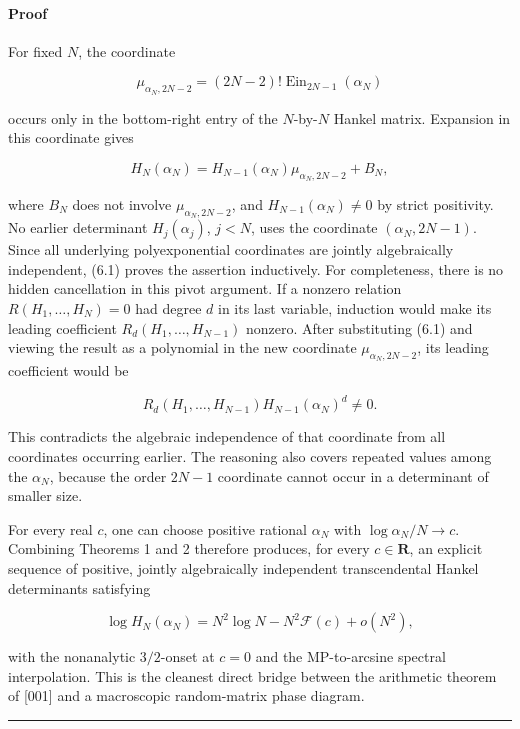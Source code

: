\documentclass[11pt]{article}
\theoremstyle{keio}
\theoremstyle{definition}
\theoremstyle{remark}
\newcommand{\Ein}{\operatorname{Ein}}
\begin{document}
\paragraph{Proof}

For fixed \(N\), the coordinate

\[
\mu_{\alpha_N,2N-2}=(2N-2)!\Ein_{2N-1}(\alpha_N)
\]

occurs only in the bottom-right entry of the \(N\)-by-\(N\) Hankel matrix.
Expansion in this coordinate gives

\[
H_N(\alpha_N)
=H_{N-1}(\alpha_N)\mu_{\alpha_N,2N-2}+B_N, \tag{DS-6.1}
\]

where \(B_N\) does not involve \(\mu_{\alpha_N,2N-2}\), and
\(H_{N-1}(\alpha_N)\ne0\) by strict positivity. No earlier determinant
\(H_j(\alpha_j)\), \(j<N\), uses the coordinate
\((\alpha_N,2N-1)\). Since all underlying polyexponential coordinates are
jointly algebraically independent, (6.1) proves the assertion inductively.
For completeness, there is no hidden cancellation in this pivot argument.
If a nonzero relation \(R(H_1,\ldots,H_N)=0\) had degree \(d\) in its last
variable, induction would make its leading coefficient
\(R_d(H_1,\ldots,H_{N-1})\) nonzero. After substituting (6.1) and viewing
the result as a polynomial in the new coordinate
\(\mu_{\alpha_N,2N-2}\), its leading coefficient would be

\[
R_d(H_1,\ldots,H_{N-1})H_{N-1}(\alpha_N)^d\ne0.
\]

This contradicts the algebraic independence of that coordinate from all
coordinates occurring earlier. The reasoning also covers repeated values
among the \(\alpha_N\), because the order \(2N-1\) coordinate cannot occur
in a determinant of smaller size.

For every real \(c\), one can choose positive rational \(\alpha_N\) with
\(\log\alpha_N/N\to c\). Combining Theorems 1 and 2 therefore produces,
for every \(c\in\mathbf R\), an explicit sequence of positive, jointly
algebraically independent transcendental Hankel determinants satisfying

\[
\log H_N(\alpha_N)
=N^2\log N-N^2\mathcal F(c)+o(N^2),
\]

with the nonanalytic \(3/2\)-onset at \(c=0\) and the MP-to-arcsine
spectral interpolation. This is the cleanest direct bridge between the
arithmetic theorem of {[}001{]} and a macroscopic random-matrix phase diagram.

\begin{center}\rule{0.5\linewidth}{0.5pt}\end{center}
\end{document}
